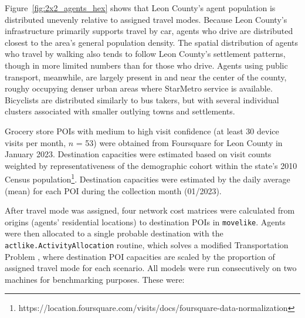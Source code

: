 Figure~\ref{fig:2x2_agents_hex} shows that Leon County's agent population is distributed unevenly relative to assigned travel modes. Because Leon County's infrastructure primarily supports travel by car, agents who drive are distributed closest to the area's general population density. The spatial distribution of agents who travel by walking also tends to follow Leon County's settlement patterns, though in more limited numbers than for those who drive. Agents using public transport, meanwhile, are largely present in and near the center of the county, roughy occupying denser urban areas where StarMetro service is available. Bicyclists are distributed similarly to bus takers, but with several individual clusters associated with smaller outlying towns and settlements. 




Grocery store POIs with medium to high visit confidence (at least 30 device visits per month, $n$ = 53) were obtained from Foursquare for Leon County in January 2023. Destination capacities were estimated based on visit counts weighted by representativeness of the demographic cohort within the state's 2010 Census population\footnote{https://location.foursquare.com/visits/docs/foursquare-data-normalization}. Destination capacities were estimated by the daily average (mean) for each POI during the collection month (01/2023).

After travel mode was assigned, four network cost matrices were calculated from origins (agents' residential locations) to destination POIs in \texttt{movelike}. Agents were then allocated to a single probable destination with the \texttt{actlike.ActivityAllocation} routine, which solves a modified Transportation Problem \cite{tp_miller_gc__2015}, where destination POI capacities are scaled \cite{lovelace_truncate_2013} by the proportion of assigned travel mode for each scenario. All models were run consecutively on two machines for benchmarking purposes. These were:

